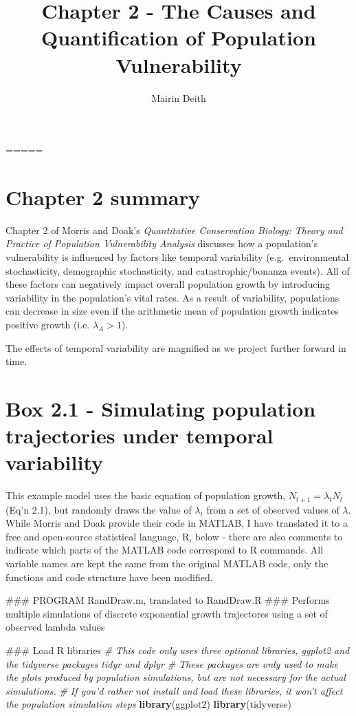 \documentclass[]{article}
\title{Chapter 2 - The Causes and Quantification of Population Vulnerability}
\author{Mairin Deith}
\date{}
\newenvironment{Shaded}{\begin{snugshade}}{\end{snugshade}}
\newcommand{\KeywordTok}[1]{\textcolor[rgb]{0.13,0.29,0.53}{\textbf{#1}}}
\newcommand{\CommentTok}[1]{\textcolor[rgb]{0.56,0.35,0.01}{\textit{#1}}}
\newcommand{\NormalTok}[1]{#1}
\begin{document}
\maketitle

=====

\section{Chapter 2 summary}\label{chapter-2-summary}

Chapter 2 of Morris and Doak's \emph{Quantitative Conservation Biology:
Theory and Practice of Population Vulnerability Analysis} discusses how
a population's vulnerability is influenced by factors like temporal
variability (e.g.~environmental stochasticity, demographic
stochasticity, and catastrophic/bonanza events). All of these factors
can negatively impact overall population growth by introducing
variability in the population's vital rates. As a result of variability,
populations can decrease in size even if the arithmetic mean of
population growth indicates positive growth (i.e. \(\lambda_A > 1\)).

The effects of temporal variability are magnified as we project further
forward in time.

\section{Box 2.1 - Simulating population trajectories under temporal
variability}\label{box-2.1---simulating-population-trajectories-under-temporal-variability}

This example model uses the basic equation of population growth,
\(N_{t+1} = \lambda_t N_t\) (Eq'n 2.1), but randomly draws the value of
\(\lambda_t\) from a set of observed values of \(\lambda\). While Morris
and Doak provide their code in MATLAB, I have translated it to a free
and open-source statistical language, R, below - there are also comments
to indicate which parts of the MATLAB code correspond to R commands. All
variable names are kept the same from the original MATLAB code, only the
functions and code structure have been modified.

\begin{Shaded}
\begin{Highlighting}[]
\NormalTok{### PROGRAM RandDraw.m, translated to RandDraw.R}
\NormalTok{### Performs multiple simulations of discrete exponential growth trajectores using a set of observed lambda values}

\NormalTok{### Load R libraries}
\CommentTok{# This code only uses three optional libraries, ggplot2 and the tidyverse packages tidyr and dplyr}
\CommentTok{# These packages are only used to make the plots produced by population simulations, but are not necessary for the actual simulations. }
\CommentTok{# If you'd rather not install and load these libraries, it won't affect the population simulation steps}
\KeywordTok{library}\NormalTok{(ggplot2)}
\KeywordTok{library}\NormalTok{(tidyverse)}
\end{Highlighting}
\end{Shaded}
\end{document}
